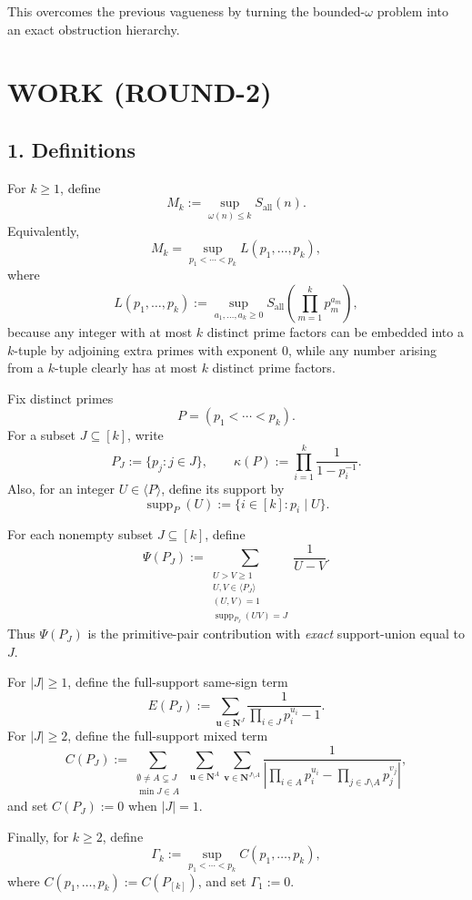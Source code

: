 This overcomes the previous vagueness by turning the bounded-\(\omega\) problem into an exact obstruction hierarchy.

\section{WORK (ROUND-2)}

\subsection*{1. Definitions}

For \(k\ge 1\), define
\[
M_k:=\sup_{\omega(n)\le k} S_{\mathrm{all}}(n).
\]
Equivalently,
\[
M_k=\sup_{p_1<\cdots<p_k}L(p_1,\dots,p_k),
\]
where
\[
L(p_1,\dots,p_k):=\sup_{a_1,\dots,a_k\ge 0}S_{\mathrm{all}}\!\left(\prod_{m=1}^{k}p_m^{a_m}\right),
\]
because any integer with at most \(k\) distinct prime factors can be embedded into a \(k\)-tuple by adjoining extra primes with exponent \(0\), while any number arising from a \(k\)-tuple clearly has at most \(k\) distinct prime factors.

Fix distinct primes
\[
P=(p_1<\cdots<p_k).
\]
For a subset \(J\subseteq [k]\), write
\[
P_J:=\{p_j:j\in J\},
\qquad
\kappa(P):=\prod_{i=1}^{k}\frac{1}{1-p_i^{-1}}.
\]
Also, for an integer \(U\in \langle P\rangle\), define its support by
\[
\operatorname{supp}_P(U):=\{i\in [k]: p_i\mid U\}.
\]

For each nonempty subset \(J\subseteq [k]\), define
\[
\Psi(P_J):=
\sum_{\substack{U>V\ge 1\\ U,V\in\langle P_J\rangle\\ (U,V)=1\\ \operatorname{supp}_{P_J}(UV)=J}}
\frac{1}{U-V}.
\]
Thus \(\Psi(P_J)\) is the primitive-pair contribution with \emph{exact} support-union equal to \(J\).

For \(|J|\ge 1\), define the full-support same-sign term
\[
E(P_J):=
\sum_{\mathbf u\in \mathbf N^{J}}
\frac{1}{\prod_{i\in J}p_i^{u_i}-1}.
\]
For \(|J|\ge 2\), define the full-support mixed term
\[
C(P_J):=
\sum_{\substack{\emptyset\neq A\subsetneq J\\ \min J\in A}}
\ 
\sum_{\mathbf u\in \mathbf N^{A}}
\sum_{\mathbf v\in \mathbf N^{J\setminus A}}
\frac{1}{\left|\prod_{i\in A}p_i^{u_i}-\prod_{j\in J\setminus A}p_j^{v_j}\right|},
\]
and set \(C(P_J):=0\) when \(|J|=1\).

Finally, for \(k\ge 2\), define
\[
\Gamma_k:=\sup_{p_1<\cdots<p_k}C(p_1,\dots,p_k),
\]
where \(C(p_1,\dots,p_k):=C(P_{[k]})\), and set \(\Gamma_1:=0\).

